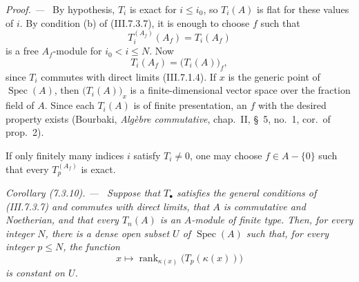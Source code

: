 \documentclass[10pt,oneside]{book}
\newcommand{\kres}{\kappa}
\newcommand{\Spec}{\operatorname{Spec}}
\newcommand{\sref}[2][]{(#2)}
\newenvironment{corollary}[1][]{\par\medskip\noindent\itshape Corollary (#1). ---\ }{\par}
\newenvironment{proof}{\par\medskip\noindent\textit{Proof. ---\ }}{\par}
\begin{document}
\begin{proof}
By hypothesis, $T_i$ is exact for $i\leq i_0$, so $T_i(A)$ is
flat for these values of $i$.  By condition (b) of
\sref{III.7.3.7}, it is enough to choose $f$ such that
\[
  T_i^{(A_f)}(A_f)=T_i(A_f)
\]
is a free $A_f$-module for $i_0<i\leq N$.  Now
\[
  T_i(A_f)=\bigl(T_i(A)\bigr)_f,
\]
since $T_i$ commutes with direct limits \sref{III.7.1.4}.  If
$x$ is the generic point of $\Spec(A)$, then
$\bigl(T_i(A)\bigr)_x$ is a finite-dimensional vector space
over the fraction field of $A$.  Since each $T_i(A)$ is of
finite presentation, an $f$ with the desired property exists
(Bourbaki, \emph{Alg\`ebre commutative}, chap.~II, \S~5,
no.~1, cor.\ of prop.~2).

If only finitely many indices $i$ satisfy $T_i\neq0$, one may
choose $f\in A-\{0\}$ such that every $T_p^{(A_f)}$ is exact.
\end{proof}

\begin{corollary}[7.3.10]
\label{III.7.3.10}
Suppose that $T_\bullet$ satisfies the general conditions of
\sref{III.7.3.7} and commutes with direct limits, that $A$ is
commutative and Noetherian, and that every $T_n(A)$ is an
$A$-module of finite type.  Then, for every integer $N$, there
is a dense open subset $U$ of $\Spec(A)$ such that, for every
integer $p\leq N$, the function
\[
  x\longmapsto
  \operatorname{rank}_{\kres(x)}
  \bigl(T_p(\kres(x))\bigr)
\]
is constant on $U$.
\end{corollary}
\end{document}
